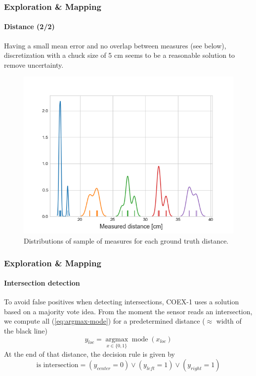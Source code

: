 \documentclass[10pt]{beamer}
\begin{document}
\begin{frame}
\frametitle{Exploration \& Mapping}
\framesubtitle{Distance (2/2)}
Having a small mean error and no overlap between measures (see below), discretization with a chuck size of 5 cm seems to be a reasonable solution to remove uncertainty.
\vspace*{-2mm}
\begin{figure}[hbtp]
\centering
\includegraphics[scale=0.45]{figures/distrib.png}
\vspace*{-2mm}
\caption{Distributions of sample of measures for each ground truth distance.}
\label{fig:distrib-dist}
\end{figure}
\end{frame}


\begin{frame}[label={frame:detect-intersect}]
\frametitle{Exploration \& Mapping}
\framesubtitle{Intersection detection}
To avoid false positives when detecting intersections, COEX-1 uses a solution based on a majority vote idea. From the moment the sensor reads an intersection, we compute all (\ref{eq:argmax-mode}) for a predetermined distance ($\approx$ width of the black line)
\begin{equation}
\label{eq:argmax-mode}
y_{loc} = \underset{x \in  \{0,1\}}{\operatorname{argmax}} \operatorname{mode}(x_{loc})
\end{equation}
At the end of that distance, the decision rule is given by
$$
\text{is intersection} = (y_{center} = 0) \lor (y_{left} = 1) \lor (y_{right} = 1) 
$$
\end{frame}
\end{document}
